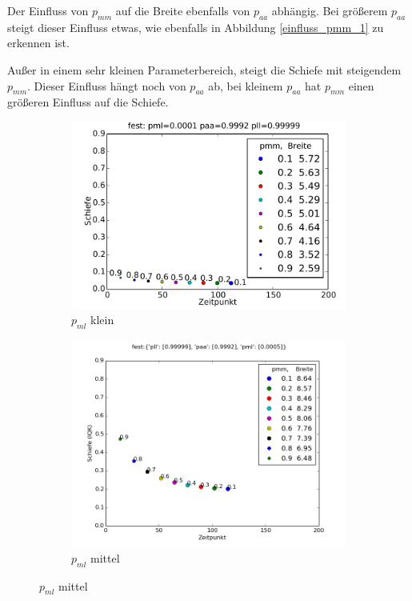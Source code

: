 Der Einfluss von $p_{mm}$ auf die Breite ebenfalls von $p_{aa}$ abhängig. Bei größerem $p_{aa}$ steigt dieser Einfluss etwas, wie ebenfalls in Abbildung \ref{einfluss_pmm_1} zu erkennen ist.


Außer in einem sehr kleinen Parameterbereich, steigt die Schiefe mit steigendem $p_{mm}$. Dieser Einfluss hängt noch von $p_{aa}$ ab, bei kleinem $p_{aa}$ hat $p_{mm}$ einen größeren Einfluss auf die Schiefe.

\begin{figure}
\begin{subfigure}{0.6\textwidth}
\includegraphics[width=\textwidth]{bilder/pmm/3fest_p_00001_09992_099999}
\caption{$p_{ml}$ klein}
\end{subfigure}

\begin{subfigure}{0.6\textwidth}
\includegraphics[width=\textwidth]{bilder/pmm/3fest_p_00005_09992_099999}
\caption{$p_{ml}$ mittel}
\end{subfigure}


\end{figure}
